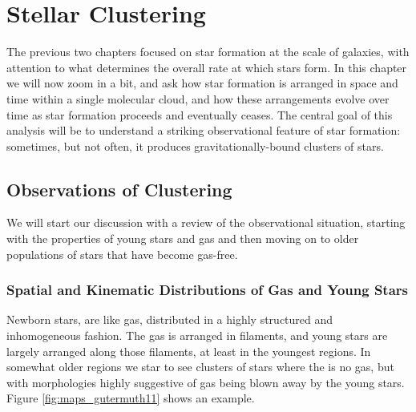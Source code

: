 \chapter{Stellar Clustering}
\label{ch:clustering}


The previous two chapters focused on star formation at the scale of galaxies, with attention to what determines the overall rate at which stars form. In this chapter we will now zoom in a bit, and ask how star formation is arranged in space and time within a single molecular cloud, and how these arrangements evolve over time as star formation proceeds and eventually ceases. The central goal of this analysis will be to understand a striking observational feature of star formation: sometimes, but not often, it produces gravitationally-bound clusters of stars.

\section{Observations of Clustering}

We will start our discussion with a review of the observational situation, starting with the properties of young stars and gas and then moving on to older populations of stars that have become gas-free.

\subsection{Spatial and Kinematic Distributions of Gas and Young Stars}

Newborn stars, are like gas, distributed in a highly structured and inhomogeneous fashion. The gas is arranged in filaments, and young stars are largely arranged along those filaments, at least in the youngest regions. In somewhat older regions we star to see clusters of stars where the is no gas, but with morphologies highly suggestive of gas being blown away by the young stars. Figure \ref{fig:maps_gutermuth11} shows an example.

